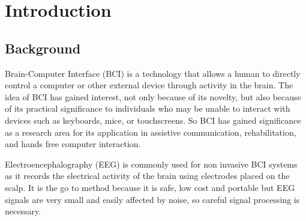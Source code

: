 \chapter{Introduction}


\section{Background}




Brain-Computer Interface (BCI) is a technology that allows a human to directly control a computer or other external device through activity in the brain. The idea of BCI has gained interest, not only because of its novelty, but also because of its practical significance to individuals who may be unable to interact with devices such as keyboards, mice, or touchscreens. So BCI has gained significance as a research area for its application in assistive communication, rehabilitation, and hands free computer interaction.

Electroencephalography (EEG) is commonly used for non invasive BCI systems as it records the electrical activity of the brain using electrodes placed on the scalp. It is the go to method because it is safe, low cost and portable but EEG signals are very small and easily affected by noise, so careful signal processing is necessary. 

